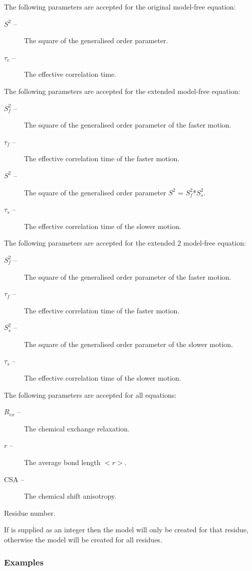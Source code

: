 The following parameters are accepted for the original model-free equation:
\begin{description}
\item[    $S^2$ --]      The square of the generalised order parameter.
\item[    $\tau_e$ --]      The effective correlation time.
\end{description}
The following parameters are accepted for the extended model-free equation:
\begin{description}
\item[    $S^2_f$ --]     The square of the generalised order parameter of the faster motion.
\item[    $\tau_f$ --]      The effective correlation time of the faster motion.
\item[    $S^2$ --]      The square of the generalised order parameter $S^2$ = $S^2_f$*$S^2_s$.
\item[    $\tau_s$ --]      The effective correlation time of the slower motion.
\end{description}
The following parameters are accepted for the extended 2 model-free equation:
\begin{description}
\item[    $S^2_f$ --]     The square of the generalised order parameter of the faster motion.
\item[    $\tau_f$ --]      The effective correlation time of the faster motion.
\item[    $S^2_s$ --]     The square of the generalised order parameter of the slower motion.
\item[    $\tau_s$ --]      The effective correlation time of the slower motion.
\end{description}
The following parameters are accepted for all equations:
\begin{description}
\item[    $R_{ex}$ --]     The chemical exchange relaxation.
\item[    $r$ --]       The average bond length $<$$r$$>$.
\item[    CSA --]     The chemical shift anisotropy.
\end{description}


Residue number.

If 
 is supplied as an integer then the model will only be created for that residue,
otherwise the model will be created for all residues.


\subsubsection{Examples}

